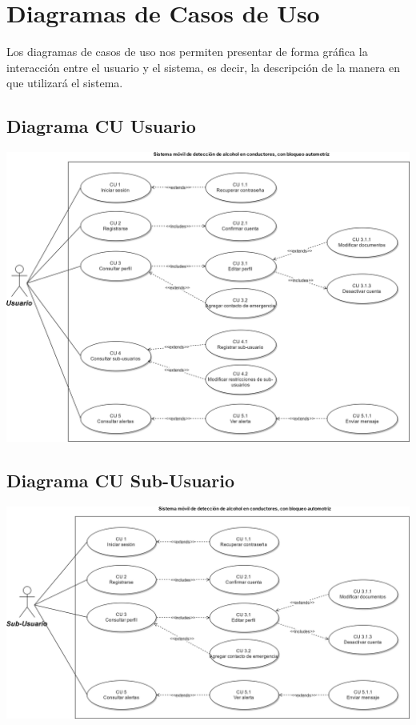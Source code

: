 \section{Diagramas de Casos de Uso}
Los diagramas de casos de uso nos permiten presentar de forma gráfica la interacción entre el usuario y el sistema, es decir, la descripción de la manera en que utilizará el sistema.
\subsection{Diagrama CU Usuario}
\begin{center}
\includegraphics[scale=.15]{Capitulo3/img/diagramas/diagrama_casos_de_uso_usuario.png}
\label{fig:dcu_usuario}
\end{center} \pagebreak
\subsection{Diagrama CU Sub-Usuario}
\begin{center}
\includegraphics[scale=.15]{Capitulo3/img/diagramas/diagrama_casos_de_uso_sub_usuario.png}
\label{fig:dcu_sub_usuario}
\end{center}
